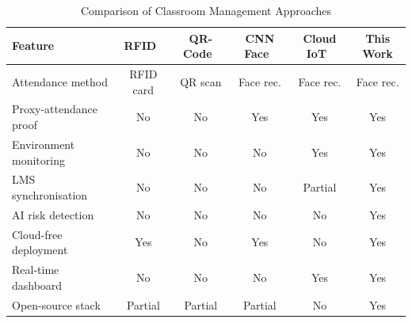 \begin{table}[t]
\centering
\caption{Comparison of Classroom Management Approaches}
\label{tab:related_work}
\begin{tabular}{@{}lccccc@{}}
\toprule
\textbf{Feature}
  & \textbf{RFID~\cite{rfid_attend_2018}}
  & \textbf{QR-Code~\cite{qr_attend_2020}}
  & \textbf{CNN Face~\cite{rpi_face_2022}}
  & \textbf{Cloud IoT~\cite{cloud_iot_class_2023}}
  & \textbf{This Work} \\
\midrule
Attendance method        & RFID card  & QR scan   & Face rec.  & Face rec. & Face rec. \\
Proxy-attendance proof   & No         & No        & Yes        & Yes       & Yes       \\
Environment monitoring   & No         & No        & No         & Yes       & Yes       \\
LMS synchronisation      & No         & No        & No         & Partial   & Yes       \\
AI risk detection        & No         & No        & No         & No        & Yes       \\
Cloud-free deployment    & Yes        & No        & Yes        & No        & Yes       \\
Real-time dashboard      & No         & No        & No         & Yes       & Yes       \\
Open-source stack        & Partial    & Partial   & Partial    & No        & Yes       \\
\bottomrule
\end{tabular}
\end{table}
